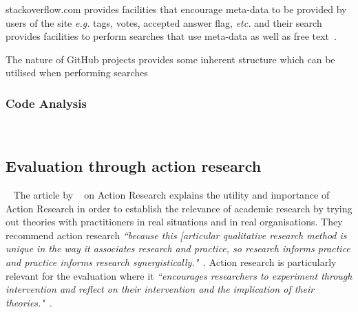 stackoverflow.com provides facilities that encourage meta-data to be provided by users of the site \textit{e.g.} tags, votes, accepted answer flag, \textit{etc.} and their search provides facilities to perform searches that use meta-data as well as free text~\citep{stackoverflow2021_search_help}.

The nature of GitHub projects provides some inherent structure which can be utilised when performing searches

\subsubsection{Code Analysis}~\label{section-code-analysis-research-method}   

\subsection{Evaluation through action research}~\label{section-evaluation-through-action-research-method}
The article by ~\citet*{avison1999_action_research} on Action Research explains the utility and importance of Action Research in order to establish the relevance of academic research by trying out theories with practitioners in real situations and in real organisations. They recommend action research \emph{``because this [articular qualitative research method is unique in the way it associates research and practice, so research informs practice and practice informs research synergistically."}~\citep[p.94]{avison1999_action_research}. Action research is particularly relevant for the evaluation where it \emph{``encourages researchers to experiment through intervention and reflect on their intervention and the implication of their theories."}~\citep[p.95]{avison1999_action_research}. 

